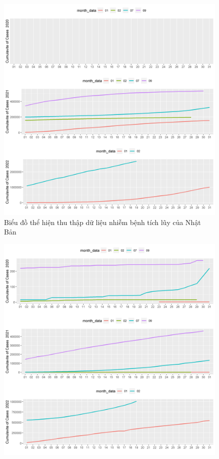 \documentclass[a4paper]{article}
\theoremstyle{definition}
\begin{document}
\begin{enumerate}[i)]
\begin{enumerate}[1)]
\begin{figure}[htp]
		    \includegraphics[scale = 0.7]{Images/V/v7 Japan .jpeg}
		    \caption{Biểu đồ thể hiện thu thập dữ liệu nhiễm bệnh tích lũy của Nhật Bản}
		    \label{fig:my_label}
		\end{figure}
		\begin{figure}[htp]
		    \centering
		    \includegraphics[scale = 0.7]{Images/V/v7 Vietnam .jpeg}

\end{figure}
\end{enumerate}
\end{enumerate}
\end{document}
